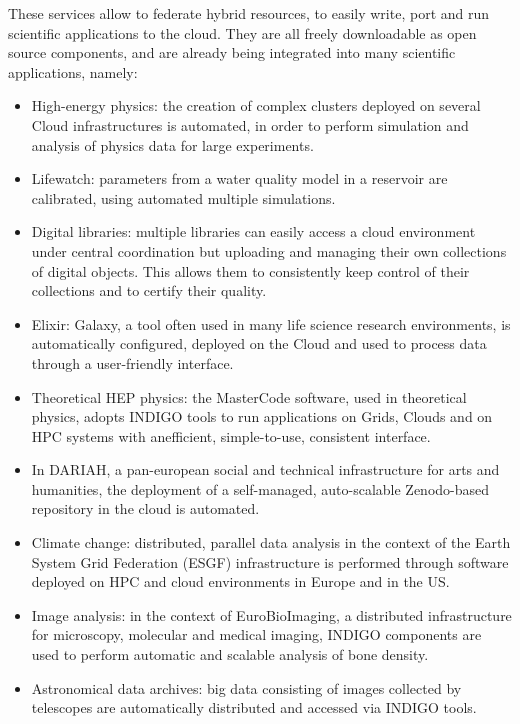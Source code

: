 \documentclass{article}
\begin{document}
These services allow to federate hybrid resources, to easily write, port and run scientific applications to the cloud. They are all freely downloadable as open source components, and are already being integrated into many scientific applications, namely: 

\begin{itemize}
\item High-energy physics: the creation of complex clusters deployed on several Cloud infrastructures is automated, in order to perform simulation and analysis of physics data for large experiments. 
\item Lifewatch: parameters from a water quality model in a reservoir are calibrated, using automated multiple simulations. 
\item Digital libraries: multiple libraries can easily access a cloud environment under central coordination but uploading and managing their own collections of digital objects. This allows them to consistently keep control of their collections and to certify their quality. 
\item Elixir: Galaxy, a tool often used in many life science research environments, is automatically configured, deployed on the Cloud and used to process data through a user-friendly interface. 
\item Theoretical HEP physics: the MasterCode software, used in theoretical physics, adopts INDIGO tools to run applications on Grids, Clouds and on HPC systems with anefficient, simple-to-use, consistent interface. 
\item In DARIAH, a pan-european social and technical infrastructure for arts and humanities, the deployment of a self-managed, auto-scalable Zenodo-based  repository in the cloud is automated. 
\item Climate change: distributed, parallel data analysis in the context of the Earth System Grid Federation (ESGF) infrastructure is performed through software deployed on HPC and cloud environments in Europe and in the US. 
\item Image analysis: in the context of EuroBioImaging, a distributed infrastructure for microscopy, molecular and medical imaging, INDIGO components are used to perform automatic and scalable analysis of bone density. 
\item Astronomical data archives: big data consisting of images collected by telescopes are automatically distributed and accessed via INDIGO tools. 
\end{itemize}
\end{document}
